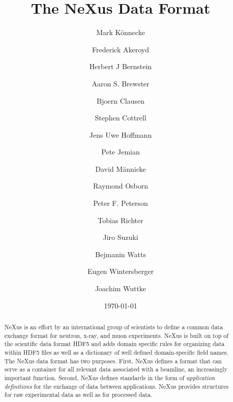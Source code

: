 \documentclass[%
 aip,
rsi,
 amsmath,amssymb,
 reprint,%
]{revtex4-1}
\begin{document}

\title{The NeXus Data Format}


\author{Mark K\"onnecke}

\author{Frederick Akeroyd}

\author{Herbert J Bernstein}

\author{Aaron S. Brewster}

\author{Bjoern Clausen}

\author{Stephen Cottrell}

\author{Jens Uwe Hoffmann}

\author{Pete Jemian}

\author{David M\"annicke}

\author{Raymond Osborn}

\author{Peter F. Peterson}

\author{Tobias Richter}

\author{Jiro Suzuki}

\author{Bejmanin Watts}

\author{Eugen Wintersberger}

\author{Joachim Wuttke}



\date{\today}%

\begin{abstract}
NeXus is an effort by an international group of scientists to define 
 a common data exchange format for neutron, x-ray, and muon experiments.   
NeXus is built on top of the scientific data format HDF5 and adds domain 
specific rules for organizing data within HDF5 files as well as a dictionary of well 
defined domain-specific field names. The NeXus data format has two purposes.  First, NeXus defines a
format that can serve as a container for all relevant data associated
with a beamline, an increasingly important function.  Second, NeXus
defines standards in the form of \emph{application definitions} for the
exchange of data between applications.  NeXus provides structures for raw experimental data as well as for processed data.  
\end{abstract}
\end{document}
